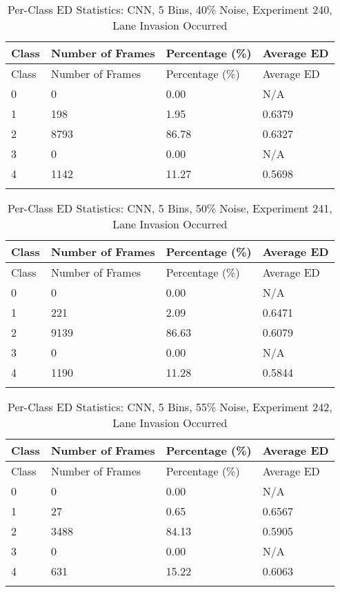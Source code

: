 
\begin{longtable}{@{}llll@{}}
\toprule
Class & Number of Frames & Percentage (\%) & Average ED \\
\midrule
\endfirsthead
\toprule
Class & Number of Frames & Percentage (\%) & Average ED \\
\midrule
\endhead
0 & 0 & 0.00 & N/A \\
1 & 198 & 1.95 & 0.6379 \\
2 & 8793 & 86.78 & 0.6327 \\
3 & 0 & 0.00 & N/A \\
4 & 1142 & 11.27 & 0.5698 \\
\bottomrule
\caption{Per-Class ED Statistics: CNN, 5 Bins, 40\% Noise, Experiment 240, Lane Invasion Occurred}
\label{tab:exp240_CNN_5bins_40noise}
\end{longtable}
        


\begin{longtable}{@{}llll@{}}
\toprule
Class & Number of Frames & Percentage (\%) & Average ED \\
\midrule
\endfirsthead
\toprule
Class & Number of Frames & Percentage (\%) & Average ED \\
\midrule
\endhead
0 & 0 & 0.00 & N/A \\
1 & 221 & 2.09 & 0.6471 \\
2 & 9139 & 86.63 & 0.6079 \\
3 & 0 & 0.00 & N/A \\
4 & 1190 & 11.28 & 0.5844 \\
\bottomrule
\caption{Per-Class ED Statistics: CNN, 5 Bins, 50\% Noise, Experiment 241, Lane Invasion Occurred}
\label{tab:exp241_CNN_5bins_50noise}
\end{longtable}
        


\begin{longtable}{@{}llll@{}}
\toprule
Class & Number of Frames & Percentage (\%) & Average ED \\
\midrule
\endfirsthead
\toprule
Class & Number of Frames & Percentage (\%) & Average ED \\
\midrule
\endhead
0 & 0 & 0.00 & N/A \\
1 & 27 & 0.65 & 0.6567 \\
2 & 3488 & 84.13 & 0.5905 \\
3 & 0 & 0.00 & N/A \\
4 & 631 & 15.22 & 0.6063 \\
\bottomrule
\caption{Per-Class ED Statistics: CNN, 5 Bins, 55\% Noise, Experiment 242, Lane Invasion Occurred}
\label{tab:exp242_CNN_5bins_55noise}
\end{longtable}
        

